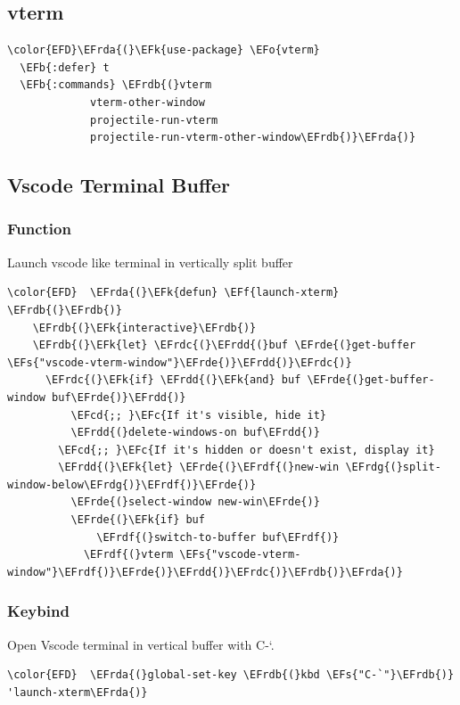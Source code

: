 \documentclass[11pt]{article}
\newcommand{\EFc}[1]{\textcolor{EFc}{#1}} %
\newcommand{\EFcd}[1]{\textcolor{EFcd}{#1}} %
\newcommand{\EFs}[1]{\textcolor{EFs}{#1}} %
\newcommand{\EFk}[1]{\textcolor{EFk}{#1}} %
\newcommand{\EFb}[1]{\textcolor{EFb}{#1}} %
\newcommand{\EFf}[1]{\textcolor{EFf}{#1}} %
\newcommand{\EFo}[1]{\textcolor{EFo}{#1}} %
\newcommand{\EFrda}[1]{\textcolor{EFrda}{#1}} %
\newcommand{\EFrdb}[1]{\textcolor{EFrdb}{#1}} %
\newcommand{\EFrdc}[1]{\textcolor{EFrdc}{#1}} %
\newcommand{\EFrdd}[1]{\textcolor{EFrdd}{#1}} %
\newcommand{\EFrde}[1]{\textcolor{EFrde}{#1}} %
\newcommand{\EFrdf}[1]{\textcolor{EFrdf}{#1}} %
\newcommand{\EFrdg}[1]{\textcolor{EFrdg}{#1}} %
\begin{document}
\subsection{vterm}
\label{sec:orgc25a76c}
\begin{Code}
\begin{Verbatim}
\color{EFD}\EFrda{(}\EFk{use-package} \EFo{vterm}
  \EFb{:defer} t
  \EFb{:commands} \EFrdb{(}vterm
             vterm-other-window
             projectile-run-vterm
             projectile-run-vterm-other-window\EFrdb{)}\EFrda{)}
\end{Verbatim}
\end{Code}
\subsection{Vscode Terminal Buffer}
\label{sec:orgb09e53a}
\subsubsection{Function}
\label{sec:orge5eba5a}
Launch vscode like terminal in vertically split buffer
\begin{Code}
\begin{Verbatim}
\color{EFD}  \EFrda{(}\EFk{defun} \EFf{launch-xterm} \EFrdb{(}\EFrdb{)}
    \EFrdb{(}\EFk{interactive}\EFrdb{)}
    \EFrdb{(}\EFk{let} \EFrdc{(}\EFrdd{(}buf \EFrde{(}get-buffer \EFs{"vscode-vterm-window"}\EFrde{)}\EFrdd{)}\EFrdc{)}
      \EFrdc{(}\EFk{if} \EFrdd{(}\EFk{and} buf \EFrde{(}get-buffer-window buf\EFrde{)}\EFrdd{)}
          \EFcd{;; }\EFc{If it's visible, hide it}
          \EFrdd{(}delete-windows-on buf\EFrdd{)}
        \EFcd{;; }\EFc{If it's hidden or doesn't exist, display it}
        \EFrdd{(}\EFk{let} \EFrde{(}\EFrdf{(}new-win \EFrdg{(}split-window-below\EFrdg{)}\EFrdf{)}\EFrde{)}
          \EFrde{(}select-window new-win\EFrde{)}
          \EFrde{(}\EFk{if} buf
              \EFrdf{(}switch-to-buffer buf\EFrdf{)}
            \EFrdf{(}vterm \EFs{"vscode-vterm-window"}\EFrdf{)}\EFrde{)}\EFrdd{)}\EFrdc{)}\EFrdb{)}\EFrda{)}
\end{Verbatim}
\end{Code}
\subsubsection{Keybind}
\label{sec:org5489f5c}
Open Vscode terminal in vertical buffer with C-`.
\begin{Code}
\begin{Verbatim}
\color{EFD}  \EFrda{(}global-set-key \EFrdb{(}kbd \EFs{"C-`"}\EFrdb{)} 'launch-xterm\EFrda{)}
\end{Verbatim}
\end{Code}
\end{document}
